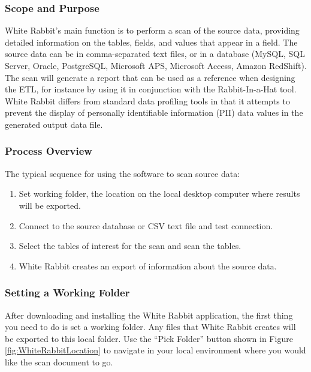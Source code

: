 \documentclass[11pt]{book}
\providecommand{\tightlist}{%
  \setlength{\itemsep}{0pt}\setlength{\parskip}{0pt}}
\theoremstyle{definition}
\theoremstyle{definition}
\theoremstyle{definition}
\theoremstyle{remark}
\begin{document}
\hypertarget{scope-and-purpose}{%
\subsubsection*{Scope and Purpose}\label{scope-and-purpose}}

White Rabbit's main function is to perform a scan of the source data, providing detailed information on the tables, fields, and values that appear in a field. The source data can be in comma-separated text files, or in a database (MySQL, SQL Server, Oracle, PostgreSQL, Microsoft APS, Microsoft Access, Amazon RedShift). The scan will generate a report that can be used as a reference when designing the ETL, for instance by using it in conjunction with the Rabbit-In-a-Hat tool. White Rabbit differs from standard data profiling tools in that it attempts to prevent the display of personally identifiable information (PII) data values in the generated output data file.

\hypertarget{process-overview}{%
\subsubsection*{Process Overview}\label{process-overview}}

The typical sequence for using the software to scan source data:

\begin{enumerate}
\def\labelenumi{\arabic{enumi}.}
\tightlist
\item
  Set working folder, the location on the local desktop computer where results will be exported.
\item
  Connect to the source database or CSV text file and test connection.
\item
  Select the tables of interest for the scan and scan the tables.
\item
  White Rabbit creates an export of information about the source data.
\end{enumerate}

\hypertarget{setting-a-working-folder}{%
\subsubsection*{Setting a Working Folder}\label{setting-a-working-folder}}

After downloading and installing the White Rabbit application, the first thing you need to do is set a working folder. Any files that White Rabbit creates will be exported to this local folder. Use the ``Pick Folder'' button shown in Figure \ref{fig:WhiteRabbitLocation} to navigate in your local environment where you would like the scan document to go.
\end{document}
